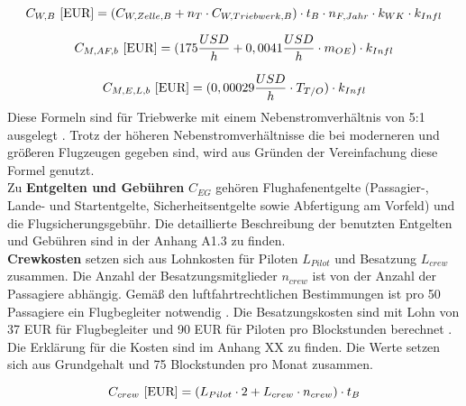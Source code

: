 \begin{equation}
   {C_{W,B} ~[\text{EUR}]} = (C_{W,Zelle,B} + n_{T} \cdot C_{W,Triebwerk,B} ) \cdot t_{B} \cdot n_{F, Jahr} \cdot k_{WK} \cdot k_{Infl}\\
   \label{maintenance}
\end{equation}

\begin{equation}
   {C_{M,AF,b} ~[\text{EUR}]} = (175 \frac{USD}{h} + 0,0041 \frac{USD}{h} \cdot m_{OE} )\cdot k_{Infl}\\
   \label{maintenance Zelle}
\end{equation}

\begin{equation}
   {C_{M,E,L,b} ~[\text{EUR}]} = (0,00029 \frac{USD}{h} \cdot T_{T/O} )\cdot k_{Infl}\\
   \label{maintenance engine}
\end{equation}
%
Diese Formeln sind für Triebwerke mit einem Nebenstromverhältnis von 5:1 ausgelegt \cite{bruge2018wartungskosten}. %
Trotz der höheren Nebenstromverhältnisse die bei moderneren und größeren Flugzeugen gegeben sind,
wird aus Gründen der Vereinfachung diese Formel genutzt.\\
%
%

Zu \textbf{Entgelten und Gebühren} $C_{EG}$ gehören Flughafenentgelte 
(Passagier-, Lande- und Startentgelte, Sicherheitsentgelte sowie Abfertigung am Vorfeld)
und die Flugsicherungsgebühr. 
Die detaillierte Beschreibung der benutzten Entgelten und Gebühren sind in der Anhang A1.3 zu finden.\\ %

\textbf{Crewkosten} setzen sich aus Lohnkosten für Piloten $L_{Pilot}$ und Besatzung $L_{crew}$ zusammen. 
Die Anzahl der Besatzungsmitglieder $n_{crew}$ ist von der Anzahl der Passagiere abhängig. 
Gemäß den luftfahrtrechtlichen Bestimmungen ist pro 50 Passagiere ein Flugbegleiter notwendig \cite{conrady2019luftverkehr}.
Die Besatzungskosten sind mit Lohn von 37 EUR für Flugbegleiter 
und 90 EUR für Piloten pro Blockstunden berechnet \cite{discover_airlines_cabin}.
Die Erklärung für die Kosten sind im Anhang XX zu finden. %
Die Werte setzen sich aus Grundgehalt und 75 Blockstunden pro Monat zusammen.

\begin{equation}
   {C_{crew} ~[\text{EUR}]} = ({L}_{Pilot} \cdot 2 + {L}_{crew} \cdot n_{crew} ) \cdot t_{B} \\
   \label{crew cost}
\end{equation}

